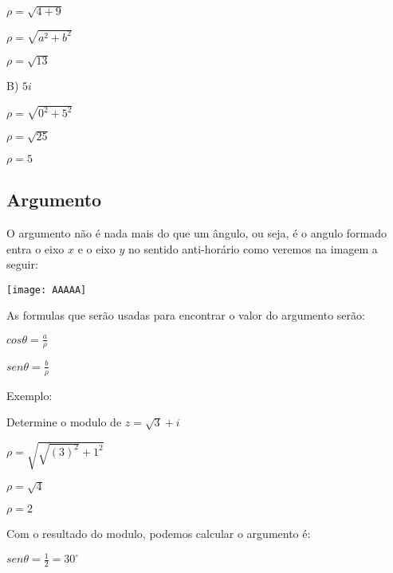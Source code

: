\documentclass[]{article}
\begin{document}
\begin{large}
\begin{flushleft}
\begin{center}
$\rho=\sqrt{4+9}$

$\rho=\sqrt{a^2+b^2}$  

$\rho=\sqrt{13}$ \vspace{.3cm}

\end{center}
B) $5i$ \vspace{.2cm}
\begin{center}
$\rho=\sqrt{0^2+5^2}$  

$\rho=\sqrt{25}$  

$\rho= 5$ \vspace{.3cm}
\end{center}
\subsection{Argumento}

O argumento não é nada mais do que um ângulo, ou seja, é o angulo formado entra o eixo $x$ e o eixo $y$ no sentido anti-horário como veremos na imagem a seguir:

\texttt{[image: AAAAA]} \vspace{.3cm}

As formulas que serão usadas para encontrar o valor do argumento serão: \vspace{.3cm}

\begin{center}
    $cos\theta = \frac{a}{\rho}$
\end{center}

\begin{center}
    $sen\theta = \frac{b}{\rho}$
\end{center}

Exemplo: \vspace{.3cm}

Determine o modulo de $z=\sqrt{3}+i$
\begin{center}
    $\rho=\sqrt{\sqrt{(3)^2}+1^2}$
    
    $\rho=\sqrt{4}$
    
    $\rho=2$
    
\end{center}

Com o resultado do modulo, podemos calcular o argumento é: \vspace{.3cm}

\begin{center}
    $sen\theta=\frac{1}{2}=30^{\circ}$
    
\end{center}


\end{flushleft}
\end{large}
\end{document}
